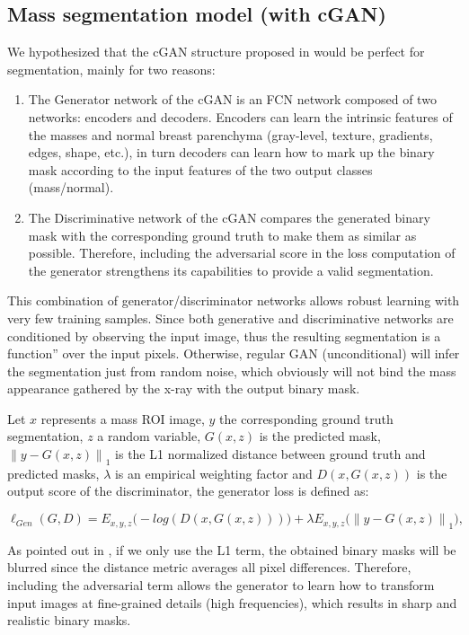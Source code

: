 \documentclass[runningheads,a4paper]{llncs}
\newcommand\norm[1]{\left\lVert#1\right\rVert}
\begin{document}
\subsection{Mass segmentation model (with cGAN)}

We hypothesized that the cGAN structure proposed in \cite{isola2017image} would be perfect for segmentation, mainly for two reasons:

\begin{enumerate}
  \item The Generator network of the cGAN is an FCN network composed of two networks: encoders and decoders. Encoders can learn the intrinsic features of the masses and normal breast parenchyma (gray-level, texture, gradients, edges, shape, etc.), in turn decoders can learn how to mark up the binary mask according to the input features of the two output classes (mass/normal).
  \item The Discriminative network of the cGAN compares the generated binary mask with the corresponding ground truth to make them as similar as possible. Therefore, including the adversarial score in the loss computation of the generator strengthens its capabilities to provide a valid segmentation.
\end{enumerate}

This combination of generator/discriminator networks allows robust learning with very few training samples. Since both generative and discriminative networks are conditioned by observing the input image, thus the resulting segmentation is a function” over the input pixels. Otherwise, regular GAN (unconditional) will infer the segmentation just from random noise, which obviously will not bind the mass appearance gathered by the x-ray with the output binary mask.

Let $x$ represents a mass ROI image, $y$ the corresponding ground truth segmentation, $z$ a random variable, $G(x, z)$ is the predicted mask, $\norm{ y-G(x, z)}_{1}$ is the L1 normalized distance between ground truth and predicted masks, $\lambda$ is an empirical weighting factor and $D(x, G(x, z))$ is the output score of the discriminator, the generator loss is defined as:

\begin{equation}
\ell_{Gen} (G,D) = E_{x,y,z} \big(-log (D(x,G(x,z)))\big)+ \lambda E_{x,y,z} \big(\norm{y-G(x,z)}_{1}\big),
\end{equation}

As pointed out in \cite{isola2017image}, if we only use the L1 term, the obtained binary masks will be blurred since the distance metric averages all pixel differences. Therefore, including the adversarial term allows the generator to learn how to transform input images at fine-grained details (high frequencies), which results in sharp and realistic binary masks.
\end{document}
